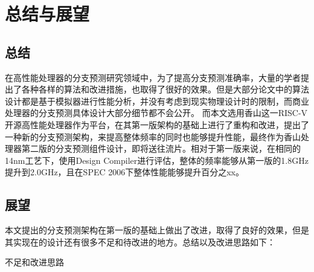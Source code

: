 
\chapter{总结与展望}

\section{总结}

在高性能处理器的分支预测研究领域中，为了提高分支预测准确率，大量的学者提出了各种各样的算法和改进措施，也取得了很好的效果。但是大部分论文中的算法设计都是基于模拟器进行性能分析，并没有考虑到现实物理设计时的限制，而商业处理器的分支预测具体设计大部分细节都不会公开。
而本文选用香山这一RISC-V开源高性能处理器作为平台，在其第一版架构的基础上进行了重构和改进，提出了一种新的分支预测架构，来提高整体频率的同时也能够提升性能，最终作为香山处理器第二版的分支预测组件设计，即将送往流片。相对于第一版来说，在相同的14nm工艺下，使用Design Compiler进行评估，整体的频率能够从第一版的1.8GHz提升到2.0GHz，且在SPEC 2006下整体性能能够提升百分之xx。

\section{展望}

本文提出的分支预测架构在第一版的基础上做出了改进，取得了良好的效果，但是其实现在的设计还有很多不足和待改进的地方。总结以及改进思路如下：

不足和改进思路